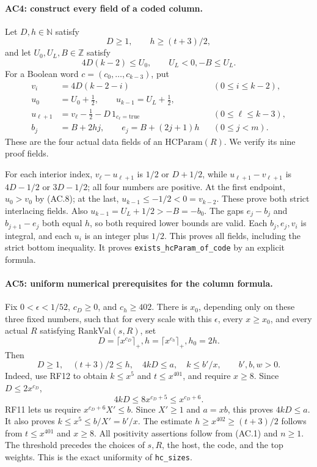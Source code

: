 \documentclass[11pt,a4paper]{article}
\numberwithin{equation}{section}
\theoremstyle{remark}\newtheorem{remark}[theorem]{Remark}
\begin{document}
\paragraph{AC4: construct every field of a coded column.}
Let $D,h\in\mathbb N$ satisfy
\[
        D\geq1,\qquad h\geq(t+3)/2,
\]
and let $U_0,U_L,B\in\mathbb Z$ satisfy
\[
             4D(k-2)\leq U_0,\qquad U_L<0,
                         -B\leq U_L.                        \tag{AC.8}
\]
For a Boolean word $c=(c_0,\ldots,c_{k-3})$, put
\[
 \begin{aligned}
 v_i&=4D(k-2-i) &&(0\leq i\leq k-2),\\
 u_0&=U_0+\tfrac12,\qquad
 u_{k-1}=U_L+\tfrac12,\\
 u_{\ell+1}&=v_\ell-\tfrac12-D\,1_{c_\ell=\mathrm{true}}
                                     &&(0\leq\ell\leq k-3),\\
 b_j&=B+2hj,\qquad e_j=B+(2j+1)h &&(0\leq j<m).
 \end{aligned}                                                 \tag{AC.9}
\]
These are the four actual data fields of an $\mathrm{HCParam}(R)$.
We verify its nine proof fields.

For each interior index, $v_\ell-u_{\ell+1}$ is $1/2$ or
$D+1/2$, while
$u_{\ell+1}-v_{\ell+1}$ is $4D-1/2$ or $3D-1/2$;
all four numbers are positive. At the first endpoint,
$u_0>v_0$ by (AC.8); at the last, $u_{k-1}\leq-1/2<0=v_{k-2}$.
These prove both strict interlacing fields. Also
$u_{k-1}=U_L+1/2>-B=-b_0$.
The gaps $e_j-b_j$ and $b_{j+1}-e_j$ both equal $h$, so both
required lower bounds are valid. Each $b_j,e_j,v_i$ is integral,
and each $u_i$ is an integer plus $1/2$.
This proves all fields, including the strict bottom inequality.
It proves \texttt{exists\_\allowbreak hcParam\_\allowbreak of\_\allowbreak code} by an explicit formula.

\paragraph{AC5: uniform numerical prerequisites for the column formula.}
Fix $0<\epsilon<1/52$, $c_D\geq0$, and $c_h\geq402$.
There is $x_0$, depending only on these three fixed numbers, such that
for every scale with this $\epsilon$, every $x\geq x_0$, and every
actual $R$ satisfying $\mathrm{RankVal}(s,R)$, set
\[
                  D=\lceil x^{c_D}\rceil_+,
             h=\lceil x^{c_h}\rceil_+,
                    h_0=2h.                                \tag{AC.10}
\]
Then
\[
 D\geq1,\quad (t+3)/2\leq h,\quad 4kD\leq a,
       \quad k\leq b'/x,\qquad b',b,w>0.                    \tag{AC.11}
\]
Indeed, use RF12 to obtain $k\leq x^5$ and $t\leq x^{401}$,
and require $x\geq8$. Since $D\leq2x^{c_D}$,
\[
       4kD\leq8x^{c_D+5}\leq x^{c_D+6}.
\]
RF11 lets us require $x^{c_D+6}X'\leq b$.
Since $X'\geq1$ and $a=xb$, this proves $4kD\leq a$.
It also proves $k\leq x^5\leq b/X'=b'/x$.
The estimate $h\geq x^{402}\geq(t+3)/2$ follows from
$t\leq x^{401}$ and $x\geq8$.
All positivity assertions follow from (AC.1) and $n\geq1$.
The threshold precedes the choices of $s,R$, the host, the code,
and the top weights. This is the exact uniformity of
\texttt{hc\_\allowbreak sizes}.
\end{document}
